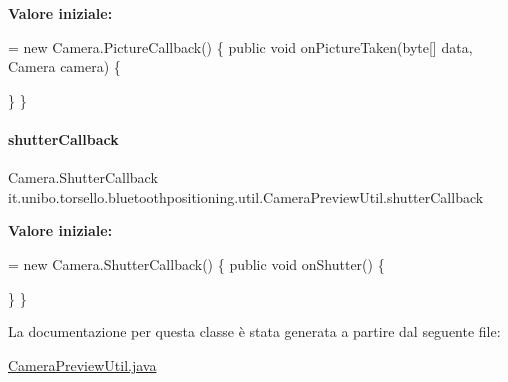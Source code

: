 {\bfseries Valore iniziale\+:}
\begin{DoxyCode}
= \textcolor{keyword}{new} Camera.PictureCallback() \{
        \textcolor{keyword}{public} \textcolor{keywordtype}{void} onPictureTaken(byte[] data, Camera camera) \{
            
        \}
    \}
\end{DoxyCode}
\hypertarget{classit_1_1unibo_1_1torsello_1_1bluetoothpositioning_1_1util_1_1CameraPreviewUtil_a146053288e01aa0d0ad482050182a1a4_a146053288e01aa0d0ad482050182a1a4}{}\label{classit_1_1unibo_1_1torsello_1_1bluetoothpositioning_1_1util_1_1CameraPreviewUtil_a146053288e01aa0d0ad482050182a1a4_a146053288e01aa0d0ad482050182a1a4} 
\paragraph{\texorpdfstring{shutter\+Callback}{shutterCallback}}
{\footnotesize\ttfamily Camera.\+Shutter\+Callback it.\+unibo.\+torsello.\+bluetoothpositioning.\+util.\+Camera\+Preview\+Util.\+shutter\+Callback\hspace{0.3cm}{\ttfamily [package]}}

{\bfseries Valore iniziale\+:}
\begin{DoxyCode}
= \textcolor{keyword}{new} Camera.ShutterCallback() \{
        \textcolor{keyword}{public} \textcolor{keywordtype}{void} onShutter() \{
            
        \}
    \}
\end{DoxyCode}


La documentazione per questa classe è stata generata a partire dal seguente file\+:\begin{DoxyCompactItemize}
\item 
\hyperlink{CameraPreviewUtil_8java}{Camera\+Preview\+Util.\+java}\end{DoxyCompactItemize}
